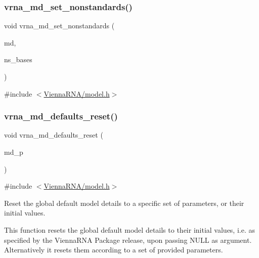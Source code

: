 \subsubsection{\texorpdfstring{vrna\+\_\+md\+\_\+set\+\_\+nonstandards()}{vrna\_md\_set\_nonstandards()}}
{\footnotesize\ttfamily void vrna\+\_\+md\+\_\+set\+\_\+nonstandards (\begin{DoxyParamCaption}\item[{\mbox{\hyperlink{group__model__details_ga1f8a10e12a0a1915f2a4eff0b28ea17c}{vrna\+\_\+md\+\_\+t}} $\ast$}]{md,  }\item[{const char $\ast$}]{ns\+\_\+bases }\end{DoxyParamCaption})}



{\ttfamily \#include $<$\mbox{\hyperlink{model_8h}{Vienna\+R\+N\+A/model.\+h}}$>$}

\mbox{\label{group__model__details_ga70834424cf804d149937de89f80ceb45}} 
\subsubsection{\texorpdfstring{vrna\+\_\+md\+\_\+defaults\+\_\+reset()}{vrna\_md\_defaults\_reset()}}
{\footnotesize\ttfamily void vrna\+\_\+md\+\_\+defaults\+\_\+reset (\begin{DoxyParamCaption}\item[{\mbox{\hyperlink{group__model__details_ga1f8a10e12a0a1915f2a4eff0b28ea17c}{vrna\+\_\+md\+\_\+t}} $\ast$}]{md\+\_\+p }\end{DoxyParamCaption})}



{\ttfamily \#include $<$\mbox{\hyperlink{model_8h}{Vienna\+R\+N\+A/model.\+h}}$>$}



Reset the global default model details to a specific set of parameters, or their initial values. 

This function resets the global default model details to their initial values, i.\+e. as specified by the Vienna\+R\+NA Package release, upon passing N\+U\+LL as argument. Alternatively it resets them according to a set of provided parameters.

